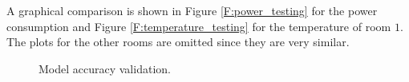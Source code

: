 A graphical comparison is shown in Figure \ref{F:power_testing} for the power consumption and Figure \ref{F:temperature_testing} for the temperature of room $1$. The plots for the other rooms are omitted since they are very similar.

\begin{figure}[t!]
\begin{center}
	\end{center}
\caption{Model accuracy validation.}
\captionsetup{justification=centering}
\label{F:testing}
\end{figure}

